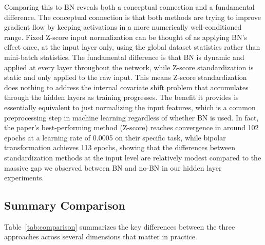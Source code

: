 \documentclass{article}
\begin{document}
Comparing this to BN reveals both a conceptual connection and a fundamental difference.
The conceptual connection is that both methods are trying to improve gradient flow by keeping
activations in a more numerically well-conditioned range. Fixed Z-score input normalization
can be thought of as applying BN's effect once, at the input layer only, using the global
dataset statistics rather than mini-batch statistics. The fundamental difference is that BN
is dynamic and applied at every layer throughout the network, while Z-score standardization
is static and only applied to the raw input. This means Z-score standardization does nothing
to address the internal covariate shift problem that accumulates through the hidden layers as
training progresses. The benefit it provides is essentially equivalent to just normalizing
the input features, which is a common preprocessing step in machine learning regardless of
whether BN is used. In fact, the paper's best-performing method (Z-score) reaches convergence
in around 102 epochs at a learning rate of 0.0005 on their specific task, while bipolar
transformation achieves 113 epochs, showing that the differences between standardization
methods at the input level are relatively modest compared to the massive gap we observed
between BN and no-BN in our hidden layer experiments.

\subsection{Summary Comparison}

Table~\ref{tab:comparison} summarizes the key differences between the three approaches across
several dimensions that matter in practice.
\end{document}
